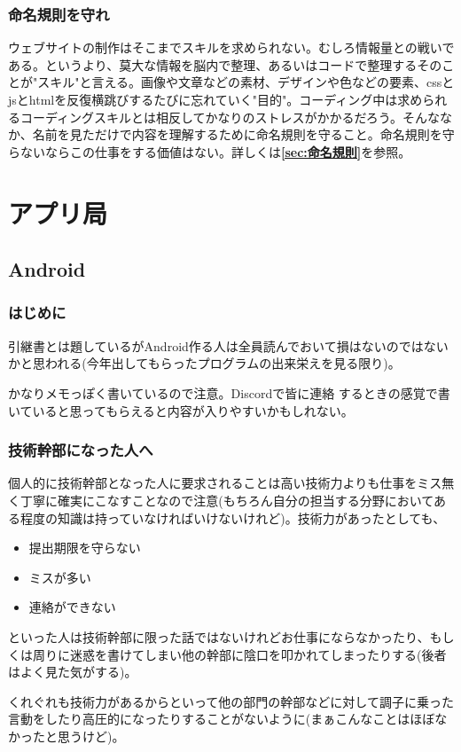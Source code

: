 \documentclass[dvipdfmx,jb5]{jarticle}
\begin{document}
\subsubsection{命名規則を守れ}
ウェブサイトの制作はそこまでスキルを求められない。むしろ情報量との戦いである。というより、莫大な情報を脳内で整理、あるいはコードで整理するそのことが"スキル"と言える。画像や文章などの素材、デザインや色などの要素、cssとjsとhtmlを反復横跳びするたびに忘れていく"目的"。コーディング中は求められるコーディングスキルとは相反してかなりのストレスがかかるだろう。そんななか、名前を見ただけで内容を理解するために命名規則を守ること。命名規則を守らないならこの仕事をする価値はない。詳しくは{\bf\ref{sec:命名規則}}を参照。

 \section{アプリ局}
 \subsection{Android}
 \subsubsection{はじめに}
 引継書とは題しているがAndroid作る人は全員読んでおいて損はないのではないかと思われる(今年出してもらったプログラムの出来栄えを見る限り)。\par
かなりメモっぽく書いているので注意。Discordで皆に連絡
するときの感覚で書いていると思ってもらえると内容が入りやすいかもしれない。
 \subsubsection{技術幹部になった人へ}
 個人的に技術幹部となった人に要求されることは高い技術力よりも仕事をミス無く丁寧に確実にこなすことなので注意(もちろん自分の担当する分野においてある程度の知識は持っていなければいけないけれど)。技術力があったとしても、
 \begin{itemize}
 \item 提出期限を守らない
 \item ミスが多い
 \item 連絡ができない
 \end{itemize}
 といった人は技術幹部に限った話ではないけれどお仕事にならなかったり、もしくは周りに迷惑を書けてしまい他の幹部に陰口を叩かれてしまったりする(後者はよく見た気がする)。\par
くれぐれも技術力があるからといって他の部門の幹部などに対して調子に乗った言動をしたり高圧的になったりすることがないように(まぁこんなことはほぼなかったと思うけど)。
\end{document}
